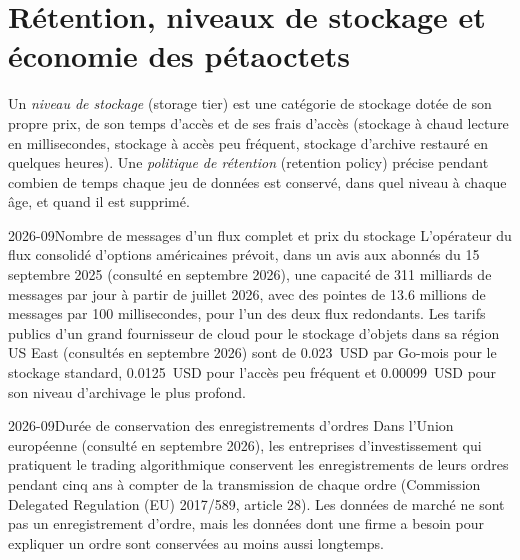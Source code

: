 \section{Rétention, niveaux de stockage et économie des pétaoctets}\label{sec:pl:capturing-and-storing-tick-data:economics}

\begin{definition}\label{def:pl:capturing-and-storing-tick-data:tier}
Un \emph{niveau de stockage} (storage tier) est une catégorie de stockage dotée de son propre prix, de son temps d'accès et de ses frais d'accès (stockage à chaud
lecture en millisecondes, stockage à accès peu fréquent, stockage d'archive restauré en quelques heures). Une \emph{politique de rétention} (retention policy)
précise pendant combien de temps chaque jeu de données est conservé, dans quel niveau à chaque âge, et quand il est supprimé.
\end{definition}

\begin{dated}{2026-09}{Nombre de messages d'un flux complet et prix du stockage}\label{dat:pl:capturing-and-storing-tick-data:numbers}
L'opérateur du flux consolidé d'options américaines prévoit, dans un avis aux abonnés du 15 septembre 2025 (consulté en
septembre 2026), une capacité de 311 milliards de messages par jour à partir de juillet 2026, avec des pointes de 13.6 millions de messages par 100 millisecondes, pour l'un des
deux flux redondants. Les tarifs publics d'un grand fournisseur de cloud pour le stockage d'objets dans sa région US East (consultés en
septembre 2026) sont de 0.023~USD par Go-mois pour le stockage standard, 0.0125~USD pour l'accès peu fréquent et 0.00099~USD pour son niveau d'archivage le plus profond.
\end{dated}

\begin{dated}{2026-09}{Durée de conservation des enregistrements d'ordres}\label{dat:pl:capturing-and-storing-tick-data:retention}
Dans l'Union européenne (consulté en septembre 2026), les entreprises d'investissement qui pratiquent le trading algorithmique conservent les enregistrements de leurs
ordres pendant cinq ans à compter de la transmission de chaque ordre (Commission Delegated Regulation (EU) 2017/589, article 28). Les données de marché
ne sont pas un enregistrement d'ordre, mais les données dont une firme a besoin pour expliquer un ordre sont conservées au moins aussi longtemps.
\end{dated}

